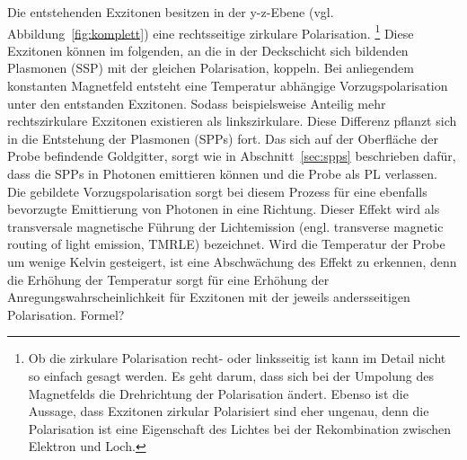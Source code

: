 Die entstehenden Exzitonen besitzen in der y-z-Ebene (vgl. Abbildung~\ref{fig:komplett}) eine 
rechtsseitige zirkulare Polarisation.
\footnote{Ob die zirkulare Polarisation recht- oder linksseitig 
ist kann im Detail nicht so einfach gesagt werden. 
Es geht darum, dass sich bei der Umpolung des Magnetfelds die Drehrichtung der Polarisation ändert.
Ebenso ist die Aussage, dass Exzitonen zirkular Polarisiert sind eher ungenau, denn die Polarisation
ist eine Eigenschaft des Lichtes bei der Rekombination zwischen Elektron und Loch.}
Diese Exzitonen können im folgenden, an die in der Deckschicht sich bildenden 
Plasmonen (SSP) mit der gleichen Polarisation, koppeln.
Bei anliegendem konstanten Magnetfeld entsteht eine Temperatur abhängige Vorzugspolarisation unter 
den entstanden Exzitonen.
Sodass beispielsweise Anteilig mehr rechtszirkulare Exzitonen existieren
als linkszirkulare. 
Diese Differenz pflanzt sich in die Entstehung der Plasmonen (SPPs) fort.
Das sich auf der Oberfläche der Probe befindende Goldgitter, sorgt wie in Abschnitt~\ref{sec:spps}
beschrieben dafür, dass die SPPs in Photonen emittieren können und die Probe als PL verlassen.
Die gebildete Vorzugspolarisation sorgt bei diesem Prozess für eine ebenfalls bevorzugte Emittierung von Photonen
in eine Richtung. 
Dieser Effekt wird als transversale magnetische Führung der Lichtemission 
(engl. transverse magnetic routing of light emission, TMRLE) bezeichnet.
Wird die Temperatur der Probe um wenige Kelvin gesteigert, ist eine Abschwächung des Effekt zu erkennen,
denn die Erhöhung der Temperatur sorgt für eine Erhöhung der Anregungswahrscheinlichkeit für Exzitonen
mit der jeweils andersseitigen Polarisation. Formel?